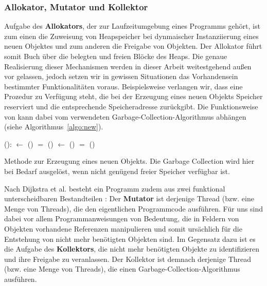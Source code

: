 
\subsubsection*{Allokator, Mutator und Kollektor}
Aufgabe des \textbf{Allokators}, der zur Laufzeitumgebung eines Programms gehört, ist zum einen die Zuweisung von Heapspeicher bei dynmaischer Instanziierung eines neuen Objektes und zum anderen die Freigabe von Objekten.
Der Allokator führt somit Buch über die belegten und freien Blöcke des Heaps.
Die genaue Realisierung dieser Mechanismen werden in dieser Arbeit weitestgehend außen vor gelassen, jedoch setzen wir in gewissen Situationen das Vorhandensein bestimmter Funktionalitäten voraus.
Beispielsweise verlangen wir, dass eine Prozedur  zu Verfügung steht, die bei der Erzeugung eines neuen Objekts Speicher reserviert und die entsprechende Speicheradresse zurückgibt.
Die Funktionsweise von  kann dabei vom verwendeten Garbage-Collection-Algorithmus abhängen (siehe Algorithmus~\ref{algo:new}).

\begin{algorithm}
\begin{algorithmic}[1]
	\State {}():
	\State \quad {} $\gets$ ()		
	\State \quad \IF {} $=$ \Null		{}
	\State \quad \quad {}()	
	\State \quad \quad {} $\gets$ ()	
	\State \quad \quad \IF {} $=$ \Null
	\State \quad \quad \quad {}()
	\State \quad \Return {}
\end{algorithmic}
\caption[Methode  zur Erzeugung eines neuen Objekts]{Methode  zur Erzeugung eines neuen Objekts. Die Garbage Collection wird hier bei Bedarf ausgelöst, wenn nicht genügend freier Speicher verfügbar ist.}
\label{algo:new}
\end{algorithm}

Nach Dijkstra et al. besteht ein Programm zudem aus zwei funktional unterscheidbaren Bestandteilen \cite[S. 967]{dijkstra1978}:
Der \textbf{Mutator} ist derjenige Thread (bzw. eine Menge von Threads), die den eigentlichen Programmcode ausführen.
Für uns sind dabei vor allem Programmanweisungen von Bedeutung, die in Feldern von Objekten vorhandene Referenzen manipulieren und somit ursächlich für die Entstehung von nicht mehr benötigten Objekten sind.
Im Gegensatz dazu ist es die Aufgabe des \textbf{Kollektors}, die nicht mehr benötigten Objekte zu identifizieren und ihre Freigabe zu veranlassen.
Der Kollektor ist demnach derjenige Thread (bzw. eine Menge von Threads), die einen Garbage-Collection-Algorithmus ausführen.

